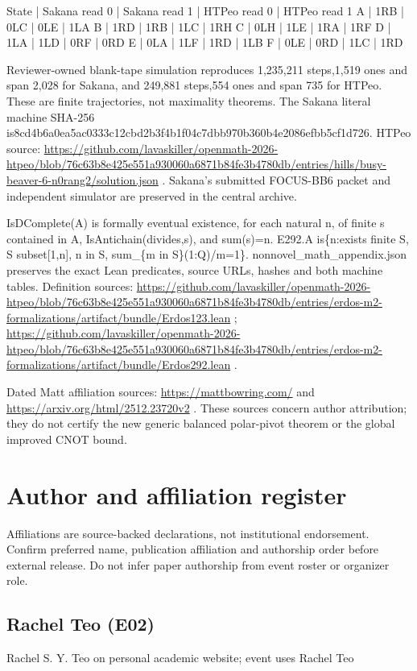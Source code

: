 \documentclass[11pt,a4paper]{article}
\begin{document}
State | Sakana read 0 | Sakana read 1 | HTPeo read 0 | HTPeo read 1
A | 1RB | 0LC | 0LE | 1LA
B | 1RD | 1RB | 1LC | 1RH
C | 0LH | 1LE | 1RA | 1RF
D | 1LA | 1LD | 0RF | 0RD
E | 0LA | 1LF | 1RD | 1LB
F | 0LE | 0RD | 1LC | 1RD

Reviewer-owned blank-tape simulation reproduces 1,235,211 steps,1,519 ones and span 2,028 for Sakana, and 249,881 steps,554 ones and span 735 for HTPeo. These are finite trajectories, not maximality theorems. The Sakana literal machine SHA-256 is8cd4b6a0ea5ac0333c12cbd2b3f4b1f04c7dbb970b360b4e2086efbb5cf1d726. HTPeo source: \url{https://github.com/lavaskiller/openmath-2026-htpeo/blob/76c63b8e425e551a930060a6871b84fe3b4780db/entries/hills/busy-beaver-6-n0rang2/solution.json} . Sakana's submitted FOCUS-BB6 packet and independent simulator are preserved in the central archive.

IsDComplete(A) is formally eventual existence, for each natural n, of finite s contained in A, IsAntichain(divides,s), and sum(s)=n. E292.A is\{n:exists finite S, S subset[1,n], n in S, sum\_\{m in S\}(1:Q)/m=1\}. nonnovel\_math\_appendix.json preserves the exact Lean predicates, source URLs, hashes and both machine tables. Definition sources: \url{https://github.com/lavaskiller/openmath-2026-htpeo/blob/76c63b8e425e551a930060a6871b84fe3b4780db/entries/erdos-m2-formalizations/artifact/bundle/Erdos123.lean} ; \url{https://github.com/lavaskiller/openmath-2026-htpeo/blob/76c63b8e425e551a930060a6871b84fe3b4780db/entries/erdos-m2-formalizations/artifact/bundle/Erdos292.lean} .

Dated Matt affiliation sources: \url{https://mattbowring.com/} and \url{https://arxiv.org/html/2512.23720v2} . These sources concern author attribution; they do not certify the new generic balanced polar-pivot theorem or the global improved CNOT bound.

\clearpage
\section{Author and affiliation register}
Affiliations are source-backed declarations, not institutional endorsement. Confirm preferred name, publication affiliation and authorship order before external release. Do not infer paper authorship from event roster or organizer role.

\subsection{Rachel Teo (E02)}
Rachel S. Y. Teo on personal academic website; event uses Rachel Teo
\end{document}

